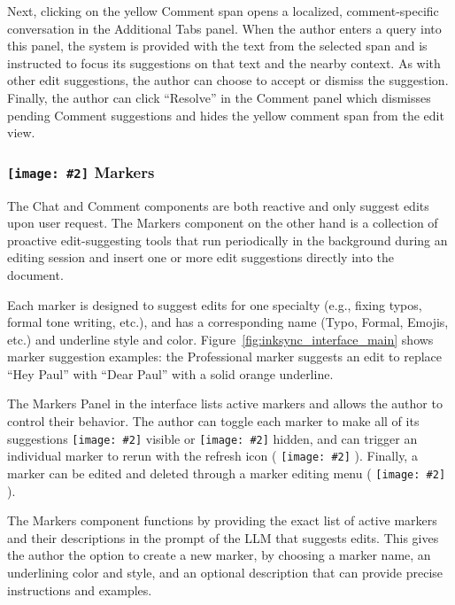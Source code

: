 \documentclass[manuscript]{acmart}
\newcommand{\symbolimg}[2][0.4cm]{%
  \texttt{[image: \#2]}%
}
\begin{document}
Next, clicking on the yellow Comment span opens a localized, comment-specific conversation in the Additional Tabs panel. When the author enters a query into this panel, the system is provided with the text from the selected span and is instructed to focus its suggestions on that text and the nearby context.
As with other edit suggestions, the author can choose to accept or dismiss the suggestion. Finally, the author can click ``Resolve'' in the Comment panel which dismisses pending Comment suggestions and hides the yellow comment span from the edit view.

\subsubsection{\symbolimg{figures/icons/marker_symbol.png} Markers} \label{sec:markers}

The Chat and Comment components are both reactive and only suggest edits upon user request. The Markers component on the other hand is a collection of proactive edit-suggesting tools that run periodically in the background during an editing session and insert one or more edit suggestions directly into the document. 

Each marker is designed to suggest edits for one specialty (e.g., fixing typos, formal tone writing, etc.), and has a corresponding name (Typo, Formal, Emojis, etc.) and underline style and color. Figure~\ref{fig:inksync_interface_main} shows marker suggestion examples: the Professional marker suggests an edit to replace ``Hey Paul'' with ``Dear Paul'' with a solid orange underline.

The Markers Panel in the interface lists active markers and allows the author to control their behavior. The author can toggle each marker to make all of its suggestions \symbolimg[0.3cm]{figures/icons/marker_show.png} visible or \symbolimg[0.3cm]{figures/icons/marker_hide.png} hidden, and can trigger an individual marker to rerun with the refresh icon (\symbolimg[0.3cm]{figures/icons/marker_refresh.png}). Finally, a marker can be edited and deleted through a marker editing menu (\symbolimg[0.3cm]{figures/icons/marker_edit.png}).

The Markers component functions by providing the exact list of active markers and their descriptions in the prompt of the LLM that suggests edits. This gives the author the option to create a new marker, by choosing a marker name,  an underlining color and style, and an optional description that can provide precise instructions and examples. %
\end{document}
